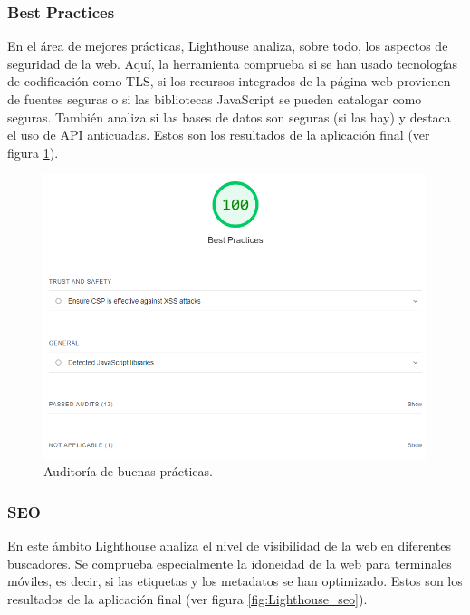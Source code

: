 \documentclass[12pt,twoside,titlepage]{report}
\begin{document}
\subsubsection{Best Practices}

En el área de mejores prácticas, Lighthouse analiza, sobre todo, los aspectos de seguridad de la web. Aquí, la herramienta comprueba si se han usado tecnologías de codificación como TLS, si los recursos integrados de la página web provienen de fuentes seguras o si las bibliotecas JavaScript se pueden catalogar como seguras. También analiza si las bases de datos son seguras (si las hay) y destaca el uso de API anticuadas. Estos son los resultados de la aplicación final (ver figura \ref{fig:Lighthouse_bestpractices}).

\begin{figure}[H]
    \centering
    \includegraphics[scale=0.6]{Lighthouse/BestPractices}
    \caption{Auditoría de buenas prácticas.}
    \label{fig:Lighthouse_bestpractices}
\end{figure}

\subsubsection{SEO}

En este ámbito Lighthouse analiza el nivel de visibilidad de la web en diferentes buscadores. Se comprueba especialmente la idoneidad de la web para terminales móviles, es decir, si las etiquetas y los metadatos se han optimizado. Estos son los resultados de la aplicación final (ver figura \ref{fig:Lighthouse_seo}).
\end{document}
